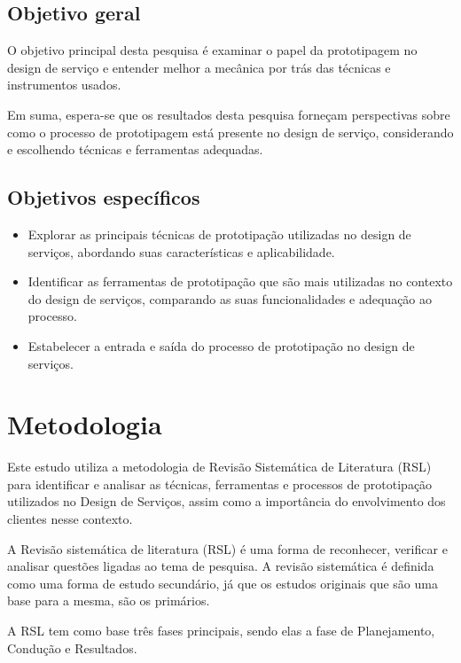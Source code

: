 \subsection{Objetivo geral}

O objetivo principal desta pesquisa é examinar o papel da prototipagem no design de serviço e entender melhor a mecânica por trás das técnicas e instrumentos usados.

Em suma, espera-se que os resultados desta pesquisa forneçam perspectivas sobre como o processo de prototipagem está presente no design de serviço, considerando e escolhendo técnicas e ferramentas adequadas.

\subsection{Objetivos específicos}

\begin{itemize}
	\item Explorar as principais técnicas de prototipação utilizadas no design de serviços, abordando suas características e aplicabilidade.
	
	\item Identificar as ferramentas de prototipação que são mais utilizadas no contexto do design de serviços, comparando as suas funcionalidades e adequação ao processo.
	
	\item Estabelecer a entrada e saída do processo de prototipação no design de serviços.%
\end{itemize}

\section{Metodologia}

Este estudo utiliza a metodologia de Revisão Sistemática de Literatura (RSL) para identificar e analisar as técnicas, ferramentas e processos de prototipação utilizados no Design de Serviços, assim como a importância do envolvimento dos clientes nesse contexto. 

A Revisão sistemática de literatura (RSL) é uma forma de reconhecer, verificar e analisar questões ligadas ao tema de pesquisa. A revisão sistemática é definida como uma forma de estudo secundário, já que os estudos originais que são uma base para a mesma, são os primários.

A RSL tem como base três fases principais, sendo elas a fase de Planejamento, Condução e Resultados.

